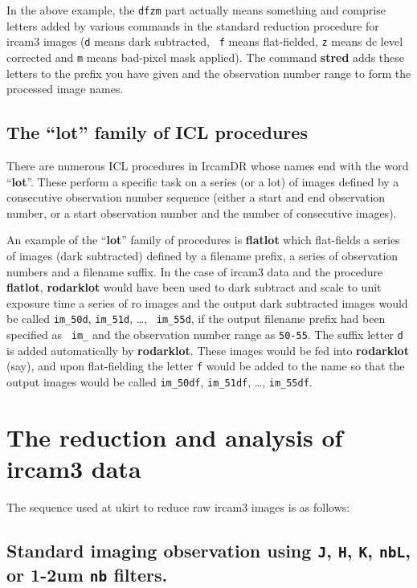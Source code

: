 In the above example, the {\tt dfzm} part actually means something and
comprise letters added by various commands in the standard reduction
procedure for {\sc ircam3} images ({\tt d} means dark subtracted, {\tt
f} means flat-fielded, {\tt z} means dc level corrected and {\tt m}
means bad-pixel mask applied).  The command {\bf stred} adds these
letters to the prefix you have given and the observation number range
to form the processed image names.

\subsection{\label{ss:lot_procedures}The ``lot'' family of ICL procedures}

There are numerous ICL procedures in {\sc IrcamDR} whose names end with
the word ``{\bf lot}''.  These perform a specific task on a series (or
a lot) of images defined by a consecutive observation number sequence
(either a start and end observation number, or a start observation
number and the number of consecutive images).

An example of the ``{\bf lot}'' family of procedures is {\bf flatlot} which
flat-fields a series of images (dark subtracted) defined by a filename
prefix, a series of observation numbers and a filename suffix.  In the
case of {\sc ircam3} data and the procedure {\bf flatlot}, {\bf
rodarklot} would have been used to dark subtract and scale to unit
exposure time a series of {\sc ro} images and the output dark subtracted
images would be called {\tt im\_50d}, {\tt im\_51d}, \ldots, {\tt
im\_55d}, if the output filename prefix had been specified as {\tt
im\_} and the observation number range as {\tt 50-55}.  The suffix
letter {\tt d} is added automatically by {\bf rodarklot}.  These images
would be fed into {\bf rodarklot} (say), and upon flat-fielding the
letter {\tt f} would be added to the name so that the output images
would be called {\tt im\_50df}, {\tt im\_51df}, \ldots, {\tt im\_55df}.

\section{\label{se:ircam3_data_analysis}The reduction and analysis of {\sc ircam3} data}
 
The sequence used at {\sc ukirt} to reduce raw {\sc ircam3}
images is as follows:
 
\subsection{\label{ss:standard_imaging}Standard imaging observation using {\tt J}, {\tt H}, {\tt K}, {\tt nbL}, or 1-2um {\tt nb} filters.}

